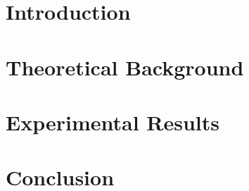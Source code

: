 \documentclass[12pt]{report}
\begin{document}
\clearpage
{} %


\chapter{Introduction}
\label{chap:Introduction}


\chapter{Theoretical Background}
\label{chap:BasicPrin}
%

\label{chap:StateArt}
%


\chapter{Experimental Results}
\label{chap:Develop}


\label{chap:Result}


\chapter{Conclusion}
\label{chap:Conclusion}




%

\clearpage


\printbibliography

\end{document}
